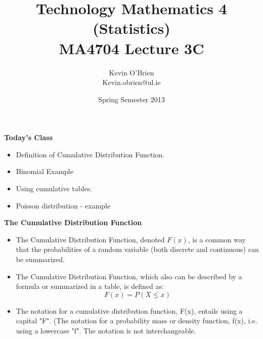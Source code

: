 \documentclass[a4]{beamer}
\title[MA4704]{Technology Mathematics 4 (Statistics) \\ {\normalsize MA4704 Lecture 3C}}
\author[Kevin O'Brien]{Kevin O'Brien \\ {\scriptsize Kevin.obrien@ul.ie}}
\date{Spring Semester 2013}
\institute[Maths \& Stats]{Dept. of Mathematics \& Statistics, \\ University \textit{of} Limerick}
\begin{document}
\titlepage


%






\textbf{Today's Class}
\begin{itemize}
\item Definition of Cumulative Distribution Function.
\item Binomial Example
\item Using cumulative tables.
\item Poisson distribution - example

\end{itemize}





\textbf{The Cumulative Distribution Function}
\begin{itemize}
\item The Cumulative Distribution Function, denoted $F(x)$, is a common way that the probabilities
of a random variable (both discrete and continuous) can be summarized.
\item The Cumulative Distribution Function, which also can be
described by a formula or summarized in a table, is defined as:
\[F(x) = P(X \leq x) \]
\item The notation for a cumulative distribution function, F(x), entails using a capital
"F".  (The notation for a probability mass or density function, f(x), i.e. using a lowercase "f". The notation is not interchangeable.
\end{itemize}


\end{document}
